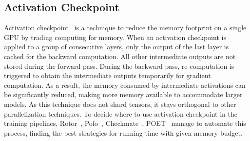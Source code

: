 \subsection{Activation Checkpoint}

Activation checkpoint~\cite{act-ckpt, dtr} is a technique to reduce the memory footprint on a single GPU by trading computing for memory. When an activation checkpoint is applied to a group of consecutive layers, only the output of the last layer is cached for the backward computation. All other intermediate outputs are not stored during the forward pass. During the backward pass, re-computation is triggered to obtain the intermediate outputs temporarily for gradient computation. As a result, the memory consumed by intermediate activations can be significantly reduced, making more memory available to accommodate larger models. As this technique does not shard tensors, it stays orthogonal to other parallelization techniques. To decide where to use activation checkpoint in the training pipelines, Rotor~\cite{herrmann2019optimal}, Pofo~\cite{beaumont2021efficient}, Checkmate~\cite{jain2020checkmate}, POET~\cite{patil2022poet} manage to automate this process, finding the best strategies for running time with given memory budget.



